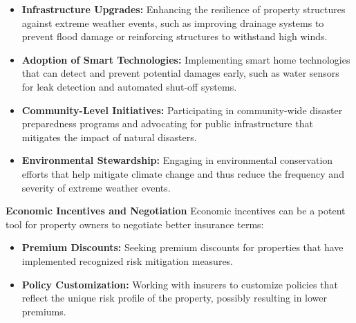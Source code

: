 \documentclass{mcmthesis}
\begin{document}
\begin{itemize}
    \item \textbf{Infrastructure Upgrades:} Enhancing the resilience of property structures against extreme weather events, such as improving drainage systems to prevent flood damage or reinforcing structures to withstand high winds.
    \item \textbf{Adoption of Smart Technologies:} Implementing smart home technologies that can detect and prevent potential damages early, such as water sensors for leak detection and automated shut-off systems.
    \item \textbf{Community-Level Initiatives:} Participating in community-wide disaster preparedness programs and advocating for public infrastructure that mitigates the impact of natural disasters.
    \item \textbf{Environmental Stewardship:} Engaging in environmental conservation efforts that help mitigate climate change and thus reduce the frequency and severity of extreme weather events.
\end{itemize}

\textbf{Economic Incentives and Negotiation}
Economic incentives can be a potent tool for property owners to negotiate better insurance terms:

\begin{itemize}
    \item \textbf{Premium Discounts:} Seeking premium discounts for properties that have implemented recognized risk mitigation measures.
    \item \textbf{Policy Customization:} Working with insurers to customize policies that reflect the unique risk profile of the property, possibly resulting in lower premiums.
\end{itemize}



\end{document}
